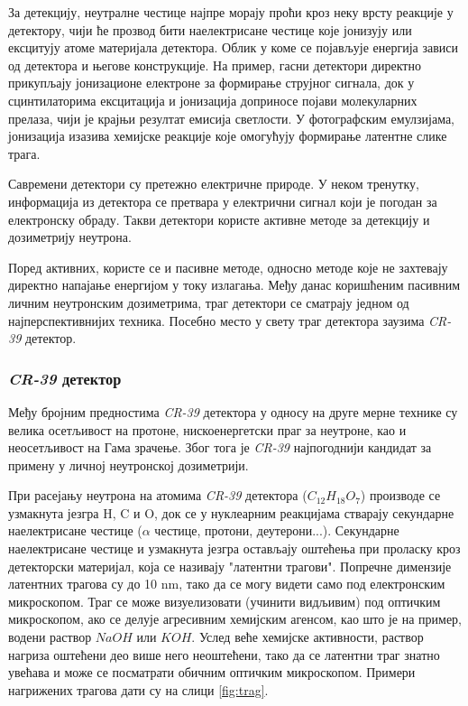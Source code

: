 \documentclass[11pt,a4paper,serbian,oneside]{book}
\begin{document}
За детекцију, неутралне честице најпре морају проћи кроз неку врсту реакције у детектору, чији ће прозвод бити наелектрисане честице које јонизују или ексцитују атоме материјала детектора. Облик у коме се појављује енергија зависи од детектора и његове конструкције.  На пример, гасни детектори директно прикупљају јонизационе електроне за формирање струјног сигнала, док у сцинтилаторима  ексцитација и јонизација доприносе појави молекуларних прелаза, чији је крајњи резултат емисија светлости. У фотографским емулзијама, јонизација изазива хемијске реакције које омогућују формирање латентне слике трага.

Савремени детектори су претежно електричне природе. У неком тренутку, информација из детектора се претвара у електрични сигнал који је погодан за електронску обраду. Такви детектори користе активне методе за детекцију и дозиметрију неутрона. 

Поред активних, користе се и пасивне методе, односно методе које не захтевају директно напајање енергијом у току излагања.  Међу данас коришћеним пасивним личним неутронским дозиметрима, траг детектори се сматрају једном од најперспективнијих техника. Посебно место у свету траг детектора заузима \textit{CR-39} детектор.

\subsubsection{\textit{CR-39} детектор}

Међу бројним предностима \textit{CR-39} детектора у односу на друге мерне технике су велика осетљивост на протоне, нискоенергетски праг за неутроне, као и неосетљивост на Гама зрачење. Због тога је \textit{CR-39} најпогоднији кандидат за примену у личној неутронској дозиметрији.

При расејању неутрона на атомима \textit{CR-39} детектора ($C_{12}H_{18}O_{7}$) производе се
узмакнута језгра H, C и O, док се у нуклеарним реакцијама стварају секундарне
наелектрисане честице ($\alpha$ честице, протони, деутерони...). Секундарне наелектрисане честице и узмакнута језгра остављају оштећења при проласку кроз детекторски материјал, која се називају "латентни трагови". Попречне димензије латентних трагова су до 10 nm, тако да се могу видети само под електронским микроскопом. Траг се може визуелизовати (учинити видљивим) под оптичким микроскопом, ако се делује агресивним хемијским агенсом, као што је на пример, водени раствор $NaOH$ или $KOH$. Услед веће хемијске активности, раствор нагриза оштећени део више него неоштећени, тако да се латентни траг знатно увећава и може се посматрати обичним оптичким микроскопом. Примери нагрижених трагова дати су на слици \ref{fig:trag}.
\end{document}
